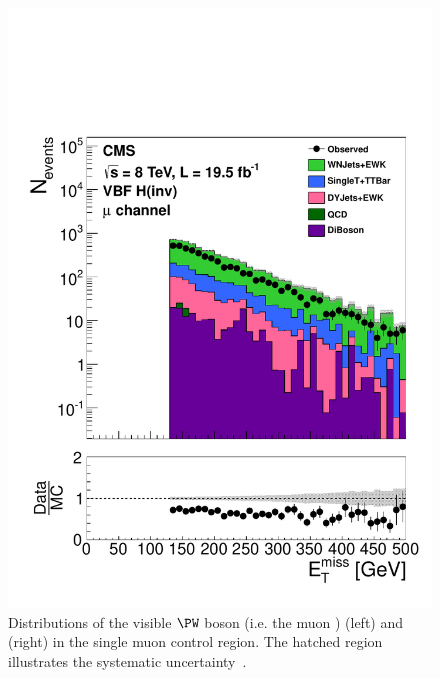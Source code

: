 \begin{figure}
  \includegraphics[width=.6\largefigwidth]{plots/prompt/AN-12-403-figs/hWMu_MET.pdf}
  \caption{Distributions of the visible $\PW$ boson \pt (i.e. the muon \pt) (left) and \MET (right) in the single muon control region. The hatched region illustrates the systematic uncertainty~\cite{ARTICLE:CMSAN-12-403}.}
  \label{fig:promptwmunu}
\end{figure}

